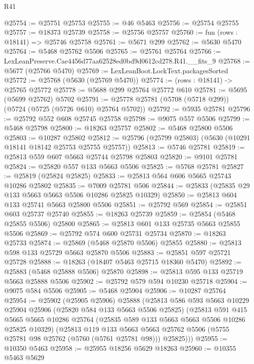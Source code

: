 \begin{lexlean}{R41}
\begin{coremodule}
@25754 := @25751 @25753
@25755 := @46 @5463
@25756 := @25754 @25755
@25757 := @18373 @25739
@25758 := @25756 @25757
@25760 := fun (rows : @18141) => @25746 @25758
@25761 := @5671 @299
@25762 := @5630 @5470
@25764 := @5468 @25762 @5506
@25765 := @25761 @25764
@25766 := LexLeanPreserve.Cae4456d77aa62528ed0bd9d0612cd278.R41.__fits_9
@25768 := @5677 (@25766 @5470)
@25769 := LexLeanBoot.LockText.packagesSorted
@25772 := @25768 (@5630 (@25769 @5470))
@25774 := (rows : @18141) -> @25765 @25772
@25778 := @5688 @299 @25764 @25772 @610
@25781 := @5695 (@5699 @25762) @5702
@25791 := @25778 @25781 (@5708 (@5718 @299)) (@5724 (@5725 (@5726 @610) @25764 @5702))
@25792 := @5935 @25781
@25796 := @25792 @552 @608 @25745 @25758
@25798 := @9075 @557 @5506
@25799 := @5468 @25798
@25800 := @18263 @25757
@25802 := @5468 @25800 @5506
@25803 := @10287 @25802
@25812 := @25796 (@25799 @25803) (@5630 (@10291 @18141 @18142 @25753 @25755 @25757))
@25813 := @5746 @25781
@25819 := @25813 @559 @607 @5663 @25744 @25798 @25803
@25820 := @9101 @25781
@25824 := @25820 @557 @133 @5663 @5506
@25825 := @5768 @25781
@25827 := @25819 (@25824 @25825)
@25833 := @25813 @564 @606 @5665 @25743 @10286 @25802
@25835 := @7009 @25781 @506
@25844 := @25833 (@25835 @29 @133 @5663 @5663 @5506 @10286 @25825 @10329)
@25850 := @25813 @604 @133 @25741 @5663 @25800 @5506
@25851 := @25792 @569
@25854 := @25851 @603 @25737 @25740
@25855 := @18263 @25739
@25859 := @25854 (@5468 @25855 @5506) @25800
@25865 := @25813 @601 @133 @25735 @5663 @25855 @5506
@25869 := @25792 @574 @600 @25731 @25734
@25870 := @18263 @25733
@25874 := @25869 (@5468 @25870 @5506) @25855
@25880 := @25813 @598 @133 @25729 @5663 @25870 @5506
@25883 := @25851 @597 @25721 @25728
@25888 := @18263 (@18407 @5463 @25715 @18360 @5470)
@25892 := @25883 (@5468 @25888 @5506) @25870
@25898 := @25813 @595 @133 @25719 @5663 @25888 @5506
@25902 := @25792 @579 @594 @10230 @25718
@25904 := @9075 @584 @5506
@25905 := @5468 @25904
@25906 := @10287 @25764
@25954 := @25902
    (@25905 @25906)
    @25888
    (@25813
      @586
      @593
      @5663
      @10229
      @25904
      @25906
      (@25820 @584 @133 @5663 @5506 @25825)
      (@25813
        @591
        @415
        @5665
        @5665
        @10286
        @25764
        (@25835 @589 @133 @5663 @5663 @5506 @10286 @25825 @10329)
        (@25813
          @119
          @133
          @5663
          @5663
          @25762
          @5506
          (@5755 @25781 @98 @25762 (@5760 (@5761 @25781 @98)))
          @25825)))
@25955 := @10350 @5463
@25958 := @25955 @18256 @5629 @18263
@25960 := @10355 @5463 @5629

\end{coremodule}
\end{lexlean}
